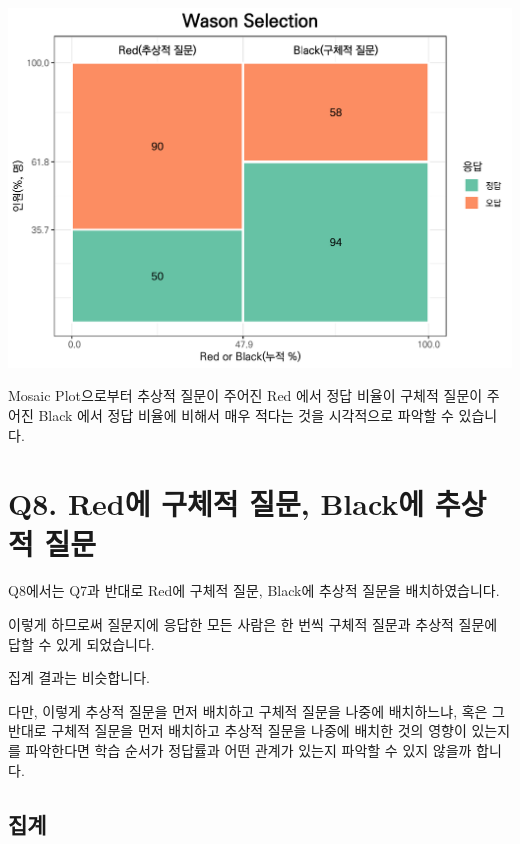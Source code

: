 \documentclass[
]{book}
\begin{document}
\includegraphics{Quiz_report_2025_files/figure-latex/unnamed-chunk-194-1.pdf}

Mosaic Plot으로부터 추상적 질문이 주어진 Red 에서 정답 비율이 구체적 질문이 주어진 Black 에서 정답 비율에 비해서 매우 적다는 것을 시각적으로 파악할 수 있습니다.

\section{Q8. Red에 구체적 질문, Black에 추상적 질문}\label{q8.-reduxc5d0-uxad6cuxccb4uxc801-uxc9c8uxbb38-blackuxc5d0-uxcd94uxc0c1uxc801-uxc9c8uxbb38}

Q8에서는 Q7과 반대로 Red에 구체적 질문, Black에 추상적 질문을 배치하였습니다.

이렇게 하므로써 질문지에 응답한 모든 사람은 한 번씩 구체적 질문과 추상적 질문에 답할 수 있게 되었습니다.

집계 결과는 비슷합니다.

다만, 이렇게 추상적 질문을 먼저 배치하고 구체적 질문을 나중에 배치하느냐, 혹은 그 반대로 구체적 질문을 먼저 배치하고 추상적 질문을 나중에 배치한 것의 영향이 있는지를 파악한다면 학습 순서가 정답률과 어떤 관계가 있는지 파악할 수 있지 않을까 합니다.

\subsection{집계}\label{uxc9d1uxacc4-14}
\end{document}

